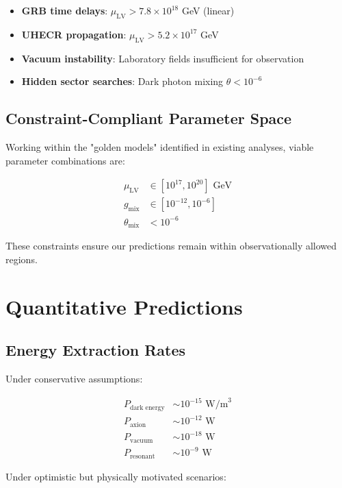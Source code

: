 \documentclass[12pt]{article}
\begin{document}
\begin{itemize}
\item \textbf{GRB time delays}: $\mu_{\text{LV}} > 7.8 \times 10^{18}$ GeV (linear)
\item \textbf{UHECR propagation}: $\mu_{\text{LV}} > 5.2 \times 10^{17}$ GeV
\item \textbf{Vacuum instability}: Laboratory fields insufficient for observation
\item \textbf{Hidden sector searches}: Dark photon mixing $\theta < 10^{-6}$
\end{itemize}

\subsection{Constraint-Compliant Parameter Space}

Working within the "golden models" identified in existing analyses, viable parameter combinations are:

\begin{align}
\mu_{\text{LV}} &\in [10^{17}, 10^{20}] \text{ GeV} \\
g_{\text{mix}} &\in [10^{-12}, 10^{-6}] \\
\theta_{\text{mix}} &< 10^{-6}
\end{align}

These constraints ensure our predictions remain within observationally allowed regions.

\section{Quantitative Predictions}

\subsection{Energy Extraction Rates}

Under conservative assumptions:

\begin{align}
P_{\text{dark energy}} &\sim 10^{-15} \text{ W/m}^3 \\
P_{\text{axion}} &\sim 10^{-12} \text{ W} \\
P_{\text{vacuum}} &\sim 10^{-18} \text{ W} \\
P_{\text{resonant}} &\sim 10^{-9} \text{ W}
\end{align}

Under optimistic but physically motivated scenarios:
\end{document}
